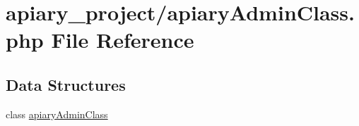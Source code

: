\hypertarget{apiary_admin_class_8php}{
\section{apiary_project/apiaryAdminClass.php File Reference}
\label{apiary_admin_class_8php}
}
\subsection*{Data Structures}
\begin{DoxyCompactItemize}
\item 
class \hyperlink{classapiary_admin_class}{apiaryAdminClass}
\end{DoxyCompactItemize}
